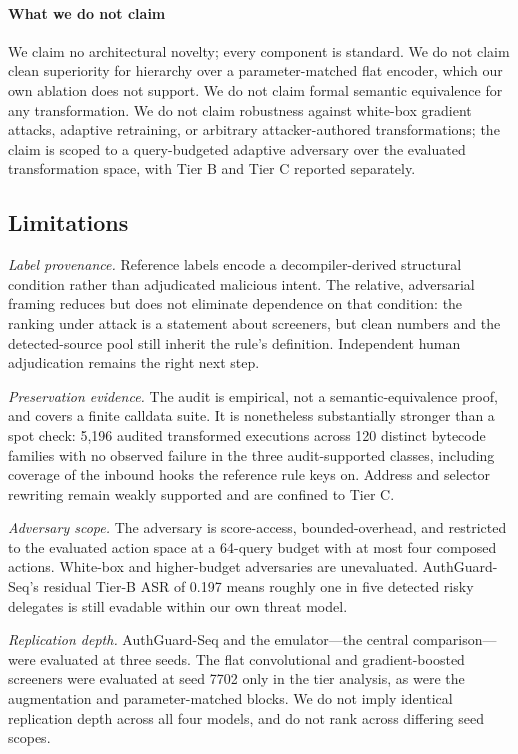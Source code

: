 \documentclass[conference]{IEEEtran}
\begin{document}
\paragraph*{What we do not claim} We claim no architectural novelty; every component is standard. We do not claim clean superiority for hierarchy over a parameter-matched flat encoder, which our own ablation does not support. We do not claim formal semantic equivalence for any transformation. We do not claim robustness against white-box gradient attacks, adaptive retraining, or arbitrary attacker-authored transformations; the claim is scoped to a query-budgeted adaptive adversary over the evaluated transformation space, with Tier B and Tier C reported separately.

\subsection{Limitations}

\emph{Label provenance.} Reference labels encode a decompiler-derived structural condition rather than adjudicated malicious intent. The relative, adversarial framing reduces but does not eliminate dependence on that condition: the ranking under attack is a statement about screeners, but clean numbers and the detected-source pool still inherit the rule's definition. Independent human adjudication remains the right next step.

\emph{Preservation evidence.} The audit is empirical, not a semantic-equivalence proof, and covers a finite calldata suite. It is nonetheless substantially stronger than a spot check: 5,196 audited transformed executions across 120 distinct bytecode families with no observed failure in the three audit-supported classes, including coverage of the inbound hooks the reference rule keys on. Address and selector rewriting remain weakly supported and are confined to Tier C.

\emph{Adversary scope.} The adversary is score-access, bounded-overhead, and restricted to the evaluated action space at a 64-query budget with at most four composed actions. White-box and higher-budget adversaries are unevaluated. AuthGuard-Seq's residual Tier-B ASR of 0.197 means roughly one in five detected risky delegates is still evadable within our own threat model.

\emph{Replication depth.} AuthGuard-Seq and the emulator---the central comparison---were evaluated at three seeds. The flat convolutional and gradient-boosted screeners were evaluated at seed 7702 only in the tier analysis, as were the augmentation and parameter-matched blocks. We do not imply identical replication depth across all four models, and do not rank across differing seed scopes.
\end{document}
